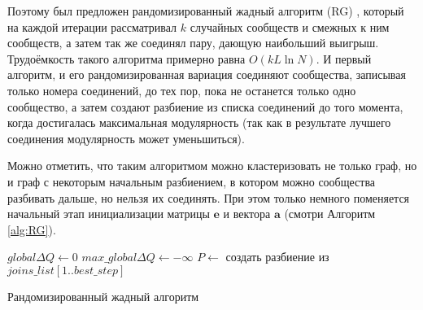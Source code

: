 Поэтому был предложен рандомизированный жадный алгоритм (RG) \cite{Ovelgoenne&Geyer-Schulz:2010}, который на каждой итерации рассматривал $k$ случайных сообществ и смежных к ним сообществ, а затем так же соединял пару, дающую наибольший выигрыш. Трудоёмкость такого алгоритма примерно равна $O(kL \ln N)$. И первый алгоритм, и его рандомизированная вариация соединяют сообщества, записывая только номера соединений, до тех пор, пока не останется только одно сообщество, а затем создают разбиение из списка соединений до того момента, когда достигалась максимальная модулярность (так как в результате лучшего соединения модулярность может уменьшиться).

Можно отметить, что таким алгоритмом можно кластеризовать не только граф, но и граф с некоторым начальным разбиением, в котором можно сообщества разбивать дальше, но нельзя их соединять. При этом только немного поменяется начальный этап инициализации матрицы $\mathbf{e}$ и вектора $\mathbf{a}$ (смотри Алгоритм \ref{alg:RG}).

\begin{algorithm}[p]
\SetAlgoLined
{}
\BlankLine
{}
$global\Delta Q \leftarrow 0$\;
$max\_global\Delta Q \leftarrow -\infty$\;
\BlankLine
{}
\BlankLine
$P \leftarrow $ создать разбиение из $joins\_list[1..best\_step]$\;
\BlankLine
\caption{Рандомизированный жадный алгоритм}
\label{alg:RG}
\end{algorithm}


